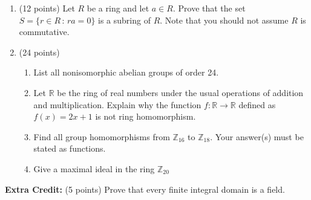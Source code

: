 \documentclass[12pt]{article}
\renewcommand{\emph}[1]{\textsf{\textbf{#1}}}
\begin{document}
\begin{enumerate}
%
\item (12 points) Let $R$ be a ring and let $a \in R.$ Prove that the set $S=\{r \in R \, : \, ra=0\}$ is a subring of $R.$ Note that you should not assume $R$ is commutative.\\

\vfill
\newpage
\item (24 points) 
\begin{enumerate}
	\item List all nonisomorphic abelian groups of order 24.
	\vfill
	\item Let $\mathbb{R}$ be the ring of real numbers under the usual operations of addition and multiplication. Explain why the function $f:\mathbb{R} \to \mathbb{R}$ defined as $f(x)=2x+1$ is not ring homomorphism.
	\vfill
	\item Find all group homomorphisms from $\mathbb{Z}_{16}$ to $\mathbb{Z}_{18}.$ Your answer(s) must be stated as functions.
	\vfill
	\item Give a maximal ideal in the ring $\mathbb{Z}_{20}$
	\vfill
\end{enumerate}
\end{enumerate}
\newpage
\emph{Extra Credit:} (5 points) Prove that every finite integral domain is a field.
\vfill
\end{document}
